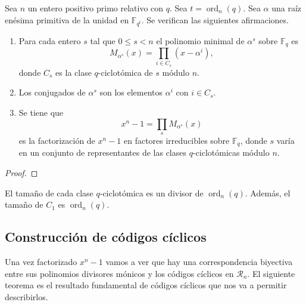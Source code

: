 \begin{theorem}
  Sea \(n\) un entero positivo primo relativo con \(q\).
  Sea \(t = \operatorname{ord}_n(q)\).
  Sea \(\alpha\) una raíz enésima primitiva de la unidad en \(\mathbb F_{q^t}\).
  Se verifican las siguientes afirmaciones.
  \begin{enumerate}
    \item Para cada entero \(s\) tal que \(0 \leq s < n\) el polinomio minimal de \(\alpha^s\) sobre \(\mathbb F_q\) es
    \[
      M_{\alpha^s}(x) = \prod_{i \in C_s}(x - \alpha^i),
    \]
    donde \(C_s\) es la clase \(q\)-ciclotómica de \(s\) módulo \(n\).
    \item Los conjugados de \(\alpha^s\) son los elementos \(\alpha^i\) con \(i \in C_s\).
    \item Se tiene que
    \[
      x^n - 1 = \prod_s M_{\alpha^s}(x)
    \]
    es la factorización de \(x^n - 1\) en factores irreducibles sobre \(\mathbb F_q\), donde \(s\) varía en un conjunto de representantes de las clases \(q\)-ciclotómicas módulo \(n\).
  \end{enumerate}
\end{theorem}

\begin{proof}
\end{proof}

\begin{theorem}
  El tamaño de cada clase \(q\)-ciclotómica es un divisor de \(\operatorname{ord}_n(q)\).
  Además, el tamaño de \(C_1\) es \(\operatorname{ord}_n(q)\).
\end{theorem}

\subsection{Construcción de códigos cíclicos}

Una vez factorizado \(x^n - 1\) vamos a ver que hay una correspondencia biyectiva entre sus polinomios divisores mónicos y los códigos cíclicos en \(\mathcal R_n\).
El siguiente teorema es el resultado fundamental de códigos cíclicos que nos va a permitir describirlos.

